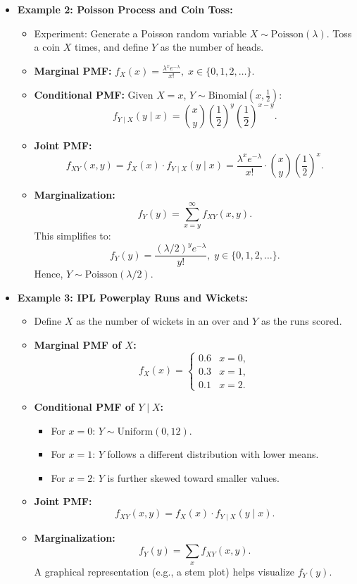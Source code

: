 \documentclass{article}
\begin{document}
\begin{itemize}
  \item \textbf{Example 2: Poisson Process and Coin Toss:}
    \begin{itemize}
      \item Experiment: Generate a Poisson random variable $X \sim \text{Poisson}(\lambda)$. Toss a coin $X$ times, and define $Y$ as the number of heads.
      \item \textbf{Marginal PMF:} $f_X(x) = \frac{\lambda^x e^{-\lambda}}{x!}, \; x \in \{0, 1, 2, \dots\}$.
      \item \textbf{Conditional PMF:} Given $X = x$, $Y \sim \text{Binomial}(x, \frac{1}{2})$:
        \[
          f_{Y \mid X}(y \mid x) = \binom{x}{y} \left(\frac{1}{2}\right)^y \left(\frac{1}{2}\right)^{x-y}.
        \]
      \item \textbf{Joint PMF:}
        \[
          f_{XY}(x, y) = f_X(x) \cdot f_{Y \mid X}(y \mid x) = \frac{\lambda^x e^{-\lambda}}{x!} \cdot \binom{x}{y} \left(\frac{1}{2}\right)^x.
        \]
      \item \textbf{Marginalization:}
        \[
          f_Y(y) = \sum_{x=y}^\infty f_{XY}(x, y).
        \]
        This simplifies to:
        \[
          f_Y(y) = \frac{(\lambda / 2)^y e^{-\lambda}}{y!}, \; y \in \{0, 1, 2, \dots\}.
        \]
        Hence, $Y \sim \text{Poisson}(\lambda / 2)$.
    \end{itemize}

  \item \textbf{Example 3: IPL Powerplay Runs and Wickets:}
    \begin{itemize}
      \item Define $X$ as the number of wickets in an over and $Y$ as the runs scored.
      \item \textbf{Marginal PMF of $X$:}
        \[
          f_X(x) =
          \begin{cases}
            0.6 & x = 0, \\
            0.3 & x = 1, \\
            0.1 & x = 2.
          \end{cases}
        \]
      \item \textbf{Conditional PMF of $Y \mid X$:}
        \begin{itemize}
          \item For $x = 0$: $Y \sim \text{Uniform}(0, 12)$.
          \item For $x = 1$: $Y$ follows a different distribution with lower means.
          \item For $x = 2$: $Y$ is further skewed toward smaller values.
        \end{itemize}
      \item \textbf{Joint PMF:}
        \[
          f_{XY}(x, y) = f_X(x) \cdot f_{Y \mid X}(y \mid x).
        \]
      \item \textbf{Marginalization:}
        \[
          f_Y(y) = \sum_{x} f_{XY}(x, y).
        \]
        A graphical representation (e.g., a stem plot) helps visualize $f_Y(y)$.
    \end{itemize}
\end{itemize}
\end{document}
